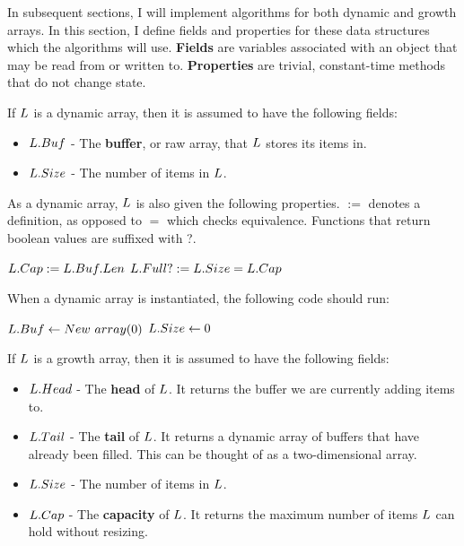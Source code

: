 In subsequent sections, I will implement algorithms for both dynamic and growth arrays. In this section, I define fields and properties for these data structures which the algorithms will use. \textbf{Fields} are variables associated with an object that may be read from or written to. \textbf{Properties} are trivial, constant-time methods that do not change state.

If $L$ is a dynamic array, then it is assumed to have the following fields:

\begin{itemize}
	\item $L.Buf$ - The \textbf{buffer}, or raw array, that $L$ stores its items in.
	\item $L.Size$ - The number of items in $L$.
\end{itemize}

As a dynamic array, $L$ is also given the following properties. $:=$ denotes a definition, as opposed to $=$ which checks equivalence. Functions that return boolean values are suffixed with ?.

\begin{algorithm}
	\begin{algorithmic}
		\State $L.Cap := L.Buf.Len$
		\State
		\State $L.Full? := L.Size = L.Cap$
	\end{algorithmic}
\end{algorithm}

When a dynamic array is instantiated, the following code should run:

\begin{algorithm}
	\begin{algorithmic}
		\State $L.Buf \gets New\ array(0)$
		\State $L.Size \gets 0$
	\end{algorithmic}
\end{algorithm}

If $L$ is a growth array, then it is assumed to have the following fields:

\begin{itemize}
	\item $L.Head$ - The \textbf{head} of $L$. It returns the buffer we are currently adding items to.
	\item $L.Tail$ - The \textbf{tail} of $L$. It returns a dynamic array of buffers that have already been filled. This can be thought of as a two-dimensional array.
	\item $L.Size$ - The number of items in $L$.
	\item $L.Cap$ - The \textbf{capacity} of $L$. It returns the maximum number of items $L$ can hold without resizing.
\end{itemize}

